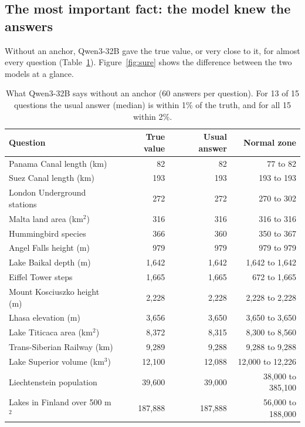 \documentclass[11pt,a4paper]{article}
\begin{document}
\subsection{The most important fact: the model knew the answers}

Without an anchor, Qwen3-32B gave the true value, or very close to it, for almost every question (Table~\ref{tab:knowledge}). Figure~\ref{fig:sure} shows the difference between the two models at a glance.

\begin{table}[ht]
\centering\small
\begin{tabular}{@{}lrrr@{}}
\toprule
\textbf{Question} & \textbf{True value} & \textbf{Usual answer} & \textbf{Normal zone} \\
\midrule
Panama Canal length (km)          & 82       & 82        & 77 to 82 \\
Suez Canal length (km)            & 193      & 193       & 193 to 193 \\
London Underground stations       & 272      & 272       & 270 to 302 \\
Malta land area (km$^2$)          & 316      & 316       & 316 to 316 \\
Hummingbird species               & 366      & 360       & 350 to 367 \\
Angel Falls height (m)            & 979      & 979       & 979 to 979 \\
Lake Baikal depth (m)             & 1,642    & 1,642     & 1,642 to 1,642 \\
Eiffel Tower steps                & 1,665    & 1,665     & 672 to 1,665 \\
Mount Kosciuszko height (m)       & 2,228    & 2,228     & 2,228 to 2,228 \\
Lhasa elevation (m)               & 3,656    & 3,650     & 3,650 to 3,650 \\
Lake Titicaca area (km$^2$)       & 8,372    & 8,315     & 8,300 to 8,560 \\
Trans-Siberian Railway (km)       & 9,289    & 9,288     & 9,288 to 9,288 \\
Lake Superior volume (km$^3$)     & 12,100   & 12,088    & 12,000 to 12,226 \\
Liechtenstein population          & 39,600   & 39,000    & 38,000 to 385,100 \\
Lakes in Finland over 500 m$^2$   & 187,888  & 187,888   & 56,000 to 188,000 \\
\bottomrule
\end{tabular}
\caption{What Qwen3-32B says without an anchor (60 answers per question). For 13 of 15 questions the usual answer (median) is within 1\% of the truth, and for all 15 within 2\%.}
\label{tab:knowledge}
\end{table}
\end{document}
